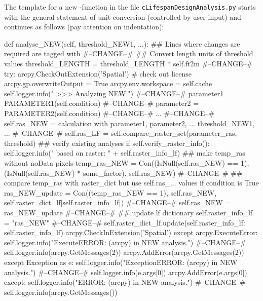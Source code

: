\clearpage
The template for a new -function in the file \texttt{cLifespanDesignAnalysis.py} starts with the general statement of unit conversion (controlled by user input) and continues as follows (pay attention on indentation):\\
\begin{python}
 def analyse_NEW(self, threshold_NEW1, ...):
     ## Lines where changes are required are tagged with #--CHANGE--#
     ## Convert length units of threshold values
     threshold_LENGTH = threshold_LENGTH * self.ft2m     #--CHANGE--#
     try:
      arcpy.CheckOutExtension('Spatial')  # check out license
      arcpy.gp.overwriteOutput = True
      arcpy.env.workspace = self.cache
      self.logger.info("      >>> Analyzing NEW.") #--CHANGE--#
      parameter1 = PARAMETER1(self.condition)      #--CHANGE--#
      parameter2 = PARAMETER2(self.condition)      #--CHANGE--#
      ...                                          #--CHANGE--#
      self.ras_NEW = calculation with parameter1, parameter2, ... threshold_NEW1, ...   #--CHANGE--#
      self.ras_LF = self.compare_raster_set(parameter_ras, threshold)
      ## verify existing analyses
      if self.verify_raster_info():
          self.logger.info("            based on raster: " + self.raster_info_lf)
          ## make temp_ras without noData pixels
          temp_ras_NEW = Con((IsNull(self.ras_NEW) == 1), (IsNull(self.ras_NEW) * some_factor), self.ras_NEW) #--CHANGE--#
          ## compare temp_ras with raster_dict but use self.ras_... values if condition is True
          ras_NEW_update = Con((temp_ras_NEW == 1), self.ras_NEW, self.raster_dict_lf[self.raster_info_lf])   #--CHANGE--#
          self.ras_NEW = ras_NEW_update   #--CHANGE--#
      ## update lf dictionary
      self.raster_info_lf = "ras_NEW"     #--CHANGE--#
      self.raster_dict_lf.update({self.raster_info_lf: self.raster_info_lf}) 
      arcpy.CheckInExtension('Spatial')
     except arcpy.ExecuteError:
        self.logger.info("ExecuteERROR: (arcpy) in NEW analysis.")    #--CHANGE--#
        self.logger.info(arcpy.GetMessages(2))
        arcpy.AddError(arcpy.GetMessages(2))
     except Exception as e:
        self.logger.info("ExceptionERROR: (arcpy) in NEW analysis.")  #--CHANGE--#
        self.logger.info(e.args[0])
        arcpy.AddError(e.args[0])
     except:
        self.logger.info("ERROR: (arcpy) in NEW analysis.")           #--CHANGE--#
        self.logger.info(arcpy.GetMessages())
\end{python}

